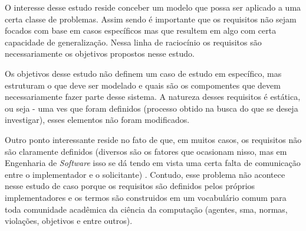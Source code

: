 O interesse desse estudo reside conceber um modelo que possa ser aplicado a uma certa classe de problemas. Assim sendo é importante que os requisitos não sejam focados com base em casos específicos mas que resultem em algo com certa capacidade de generalização. Nessa linha de raciocínio os requisitos são necessariamente os objetivos propostos nesse estudo. 

Os objetivos desse estudo não definem um caso de estudo em específico, mas estruturam o que deve ser modelado e quais são os compomentes que devem necessariamente fazer parte desse sistema. A natureza desses requisitos é estática, ou seja - uma ves que foram definidos (processo obtido na busca do que se deseja investigar), esses elementos não foram modificados. 

Outro ponto interessante reside no fato de que, em muitos casos, os requisitos não são claramente definidos (diversos são os fatores que ocasionam nisso, mas em Engenharia de \textit{Software} isso se dá tendo em vista uma certa falta de comunicação entre o implementador e o solicitante) \cite{softwareeng}. Contudo, esse problema não acontece nesse estudo de caso porque os requisitos são definidos pelos próprios implementadores e os termos são construidos em um vocabulário comum para toda comunidade acadêmica da ciência da computação (agentes, sma, normas, violações, objetivos e entre outros). 
